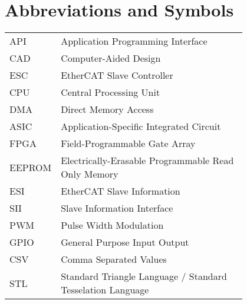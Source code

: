 \chapter*{Abbreviations and Symbols}

\begin{flushleft}
\begin{tabular}{l p{0.8\linewidth}}
API      & Application Programming Interface\\
CAD      & Computer-Aided Design\\
ESC      & EtherCAT Slave Controller\\
CPU      & Central Processing Unit\\
DMA      & Direct Memory Access\\
ASIC     & Application-Specific Integrated Circuit\\
FPGA     & Field-Programmable Gate Array\\
EEPROM   & Electrically-Erasable Programmable Read Only Memory\\
ESI      & EtherCAT Slave Information\\
SII      & Slave Information Interface\\
PWM      & Pulse Width Modulation\\
GPIO     & General Purpose Input Output\\
CSV      & Comma Separated Values\\
STL	 & Standard Triangle Language / Standard Tesselation Language\\
\end{tabular}
\end{flushleft}

